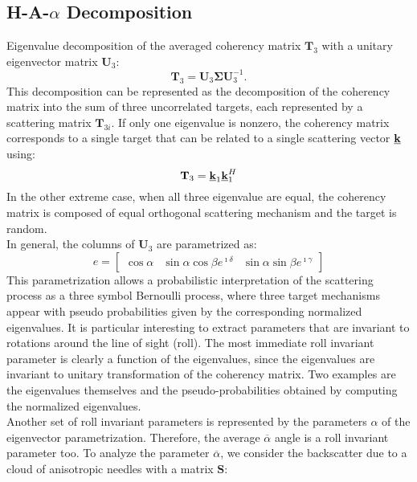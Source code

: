 \documentclass[11pt]{article}
\begin{document}
\subsection{ H-A-$\alpha$ Decomposition}  
Eigenvalue decomposition of the averaged coherency matrix $\mathbf{T}_{3}$ with a unitary eigenvector matrix $\mathbf{U}_{3}$:
\begin{equation}
	\mathbf{T}_{3} = \mathbf{U}_{3} \mathbf{\Sigma} \mathbf{U}_{3}^{-1}.
\end{equation}
This decomposition can be represented as the decomposition of the coherency matrix into the sum of three uncorrelated targets, each represented by a scattering matrix $\mathbf{T}_{3i}$.
If only one eigenvalue is nonzero, the coherency matrix corresponds to a single target that can be related to a single scattering vector $\mathbf{\underline{k}}$ using:
\begin{equation}
	\mathbf{T}_{3} = \mathbf{\underline{k}}_{1} \mathbf{\underline{k}}_{1}^{H}
\end{equation}
 In the other extreme case, when all three eigenvalue are equal, the coherency matrix is composed of equal orthogonal scattering mechanism and the target is random.\\
In general, the columns of $\mathbf{U}_{3}$ are parametrized as:
\begin{equation}
	e = 
	\begin{bmatrix}
		\cos{\alpha} & \sin{\alpha}\cos{\beta}e^{\imath \delta} & \sin{\alpha}\sin{\beta}e^{\imath \gamma}
	\end{bmatrix}
\end{equation}
This parametrization allows a probabilistic interpretation of the scattering process as a three symbol Bernoulli process, where three target mechanisms appear with pseudo probabilities given by the corresponding normalized eigenvalues. 
It is particular interesting to extract parameters that are invariant to rotations around the line of sight (roll). The most immediate roll invariant parameter is clearly a function of the eigenvalues, since the eigenvalues are invariant to unitary transformation of the coherency matrix. Two examples are the eigenvalues themselves and the pseudo-probabilities obtained by computing the normalized eigenvalues.\\ Another set of roll invariant parameters is represented by the parameters $\alpha$ of the eigenvector parametrization. Therefore, the average $\overline{\alpha}$ angle is a roll invariant parameter too. 
To analyze the parameter $\overline{\alpha}$, we consider the backscatter due to a cloud of anisotropic needles with a matrix $\mathbf{S}$:
\end{document}
